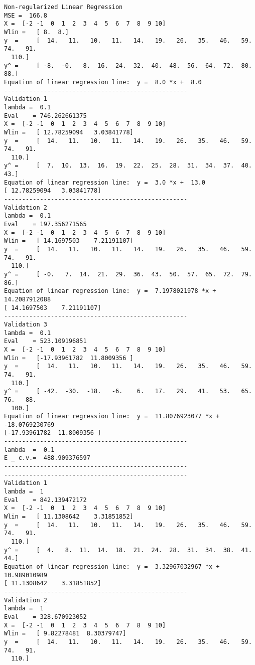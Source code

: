 \documentclass{article}
\begin{document}
\begin{lstlisting}[breaklines=true,basicstyle=\small]
Non-regularized Linear Regression
MSE =  166.8
X =	 [-2 -1  0  1  2  3  4  5  6  7  8  9 10]
Wlin =	 [ 8.  8.]
y  =	 [  14.   11.   10.   11.   14.   19.   26.   35.   46.   59.   74.   91.
  110.]
y^ =	 [ -8.  -0.   8.  16.  24.  32.  40.  48.  56.  64.  72.  80.  88.]
Equation of linear regression line:  y =  8.0 *x +  8.0
---------------------------------------------------
Validation 1
lambda =  0.1
Eval	= 746.262661375
X =	 [-2 -1  0  1  2  3  4  5  6  7  8  9 10]
Wlin =	 [ 12.78259094   3.03841778]
y  =	 [  14.   11.   10.   11.   14.   19.   26.   35.   46.   59.   74.   91.
  110.]
y^ =	 [  7.  10.  13.  16.  19.  22.  25.  28.  31.  34.  37.  40.  43.]
Equation of linear regression line:  y =  3.0 *x +  13.0
[ 12.78259094   3.03841778]
---------------------------------------------------
Validation 2
lambda =  0.1
Eval	= 197.356271565
X =	 [-2 -1  0  1  2  3  4  5  6  7  8  9 10]
Wlin =	 [ 14.1697503    7.21191107]
y  =	 [  14.   11.   10.   11.   14.   19.   26.   35.   46.   59.   74.   91.
  110.]
y^ =	 [ -0.   7.  14.  21.  29.  36.  43.  50.  57.  65.  72.  79.  86.]
Equation of linear regression line:  y =  7.1978021978 *x +  14.2087912088
[ 14.1697503    7.21191107]
---------------------------------------------------
Validation 3
lambda =  0.1
Eval	= 523.109196851
X =	 [-2 -1  0  1  2  3  4  5  6  7  8  9 10]
Wlin =	 [-17.93961782  11.8009356 ]
y  =	 [  14.   11.   10.   11.   14.   19.   26.   35.   46.   59.   74.   91.
  110.]
y^ =	 [ -42.  -30.  -18.   -6.    6.   17.   29.   41.   53.   65.   76.   88.
  100.]
Equation of linear regression line:  y =  11.8076923077 *x +  -18.0769230769
[-17.93961782  11.8009356 ]
---------------------------------------------------
lambda  =  0.1
E _ c.v.=  488.909376597
---------------------------------------------------
---------------------------------------------------
Validation 1
lambda =  1
Eval	= 842.139472172
X =	 [-2 -1  0  1  2  3  4  5  6  7  8  9 10]
Wlin =	 [ 11.1308642    3.31851852]
y  =	 [  14.   11.   10.   11.   14.   19.   26.   35.   46.   59.   74.   91.
  110.]
y^ =	 [  4.   8.  11.  14.  18.  21.  24.  28.  31.  34.  38.  41.  44.]
Equation of linear regression line:  y =  3.32967032967 *x +  10.989010989
[ 11.1308642    3.31851852]
---------------------------------------------------
Validation 2
lambda =  1
Eval	= 328.670923052
X =	 [-2 -1  0  1  2  3  4  5  6  7  8  9 10]
Wlin =	 [ 9.82278481  8.30379747]
y  =	 [  14.   11.   10.   11.   14.   19.   26.   35.   46.   59.   74.   91.
  110.]

\end{lstlisting}
\end{document}
